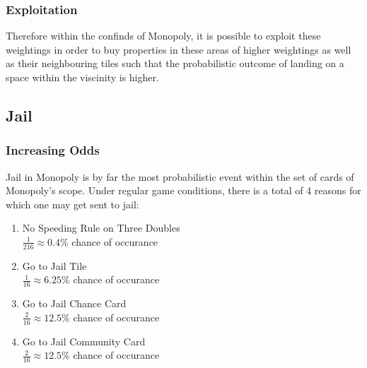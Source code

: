 \documentclass[12pt]{article}
\begin{document}
\subsubsection{Exploitation}
Therefore within the confinds of Monopoly, it is possible to exploit these weightings in order to buy properties in these areas of higher weightings as well as their neighbouring tiles such that the probabilistic outcome of landing on a space within the viscinity is higher.


\subsection{Jail}
\subsubsection{Increasing Odds}
Jail in Monopoly is by far the most probabilistic event within the set of cards of Monopoly's scope. Under regular game conditions, there is a total of 4 reasons for which one may get sent to jail:
\begin{enumerate}
  \item {No Speeding Rule on Three Doubles}\hfill\\
  $\frac{1}{216}\approx0.4\%$ chance of occurance
  \item {Go to Jail Tile}\hfill\\
  $\frac{1}{16}\approx6.25\%$ chance of occurance
  \item {Go to Jail Chance Card} \hfill\\
  $\frac{2}{16}\approx12.5\%$ chance of occurance
  \item {Go to Jail Community Card} \hfill\\
  $\frac{2}{16}\approx12.5\%$ chance of occurance
\end{enumerate}
\end{document}
